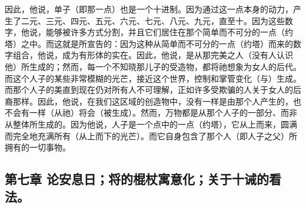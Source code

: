 因此，他说，单子（即那一点）也是一个十进制。因为通过这一点本身的动力，产生了二元、三元、四元、五元、六元、七元、八元、九元，直至十。因为这些数字，他说，能够被许多方式分割，并且它们居住在那个简单而不可分的一点（约塔）之中。而这就是所宣告的：因为这种从简单而不可分的一点（约塔）而来的数字组合，他说，成为有形体的实在。因此，他说，是从那完美之人（没有人认识他）所生成的；然而，每一个不知晓那儿子的受造物，都将祂想象为女人的后代。而这个人子的某些非常模糊的光芒，接近这个世界，控制和掌管变化（与）生成。而那个人子的美直到现在仍对所有人不可理解，正如许多受欺骗的人关于女人的后裔那样。因此，他说，在我们这区域的创造物中，没有一样是由那个人产生的，也不会有一样（从祂）将会（被生成）。然而，万物都是从那个人子的一部分、而非从整体所生成的。因为他说，人子是一个点中的一点（约塔），它从上而来，圆满而完全地充满所有（从上而下的光芒）。而它自身包含了那个人（即人子之父）所拥有的一切事物。\par


\subsection{第七章 论安息日；将的棍杖寓意化；关于十诫的看法。}

